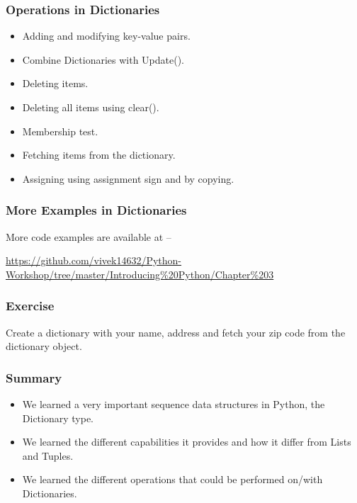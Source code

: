 \documentclass{beamer}
\begin{document}
\begin{frame}
\frametitle{Operations in Dictionaries}
\begin{itemize}
\item Adding and modifying key-value pairs.
\item Combine Dictionaries with Update().
\item Deleting items.
\item Deleting all items using clear().
\item Membership test.
\item Fetching items from the dictionary.
\item Assigning using assignment sign and by copying.
\end{itemize}
\end{frame}

\begin{frame}
\frametitle{More Examples in Dictionaries}
More code examples are available at --
 
\url{https://github.com/vivek14632/Python-Workshop/tree/master/Introducing\%20Python/Chapter\%203}
\end{frame}

\begin{frame}
\frametitle{Exercise}
Create a dictionary with your name, address and fetch your zip code from the dictionary object.
\end{frame}

\begin{frame}
\frametitle{Summary}
\begin{itemize}
\item We learned a very important sequence data structures in Python, the Dictionary type.
\item We learned the different capabilities it provides and how it differ from Lists and Tuples.
\item We learned the different operations that could be performed on/with Dictionaries.
\end{itemize}
\end{frame}
\end{document}
